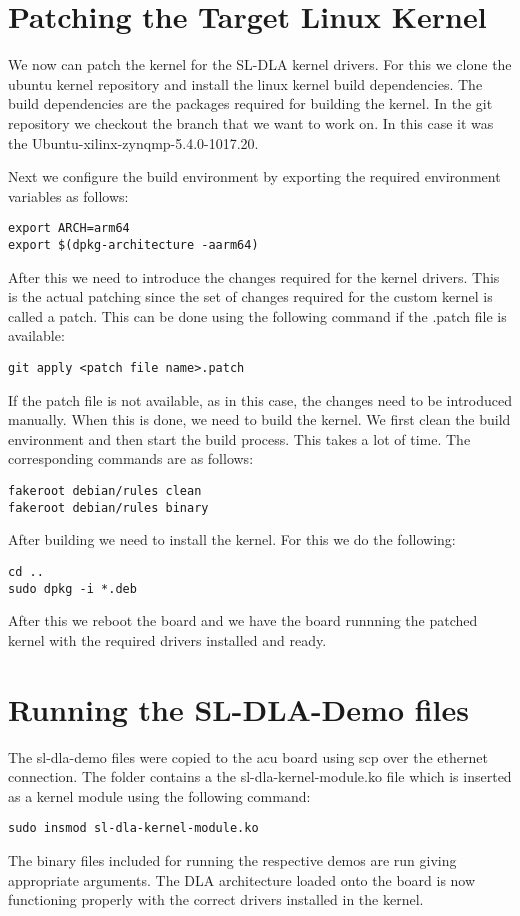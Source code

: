 \documentclass{article}
\begin{document}
\section{Patching the Target Linux Kernel}
We now can patch the kernel for the SL-DLA kernel drivers. For this we clone the ubuntu kernel repository and
install the linux kernel build dependencies. The build dependencies are the packages required for building the kernel.
In the git repository we checkout the branch that we want to work on. In this case it was the
Ubuntu-xilinx-zynqmp-5.4.0-1017.20.

\medbreak{}

Next we configure the build environment by exporting the required environment variables as follows:
\begin{lstlisting}
export ARCH=arm64
export $(dpkg-architecture -aarm64)
\end{lstlisting}

After this we need to introduce the changes required for the kernel drivers. This is the actual patching since
the set of changes required for the custom kernel is called a patch. This can be done using the following command
if the .patch file is available:
\begin{lstlisting}
git apply <patch file name>.patch
\end{lstlisting}

If the patch file is not available, as in this case, the changes need to be introduced manually. When this is done,
we need to build the kernel. We first clean the build environment and then start the build process. This takes
a lot of time. The corresponding commands are as follows:
\begin{lstlisting}
fakeroot debian/rules clean
fakeroot debian/rules binary
\end{lstlisting}

After building we need to install the kernel. For this we do the following:
\begin{lstlisting}
cd ..
sudo dpkg -i *.deb
\end{lstlisting}

After this we reboot the board and we have the board runnning the patched kernel with the required drivers
installed and ready.

\section{Running the SL-DLA-Demo files}
The sl-dla-demo files were copied to the acu board using scp over the ethernet connection. The folder contains a
the sl-dla-kernel-module.ko file which is inserted as a kernel module using the following command:
\begin{lstlisting}
sudo insmod sl-dla-kernel-module.ko
\end{lstlisting}

The binary files included for running the respective demos are run giving appropriate arguments. The DLA architecture
loaded onto the board is now functioning properly with the correct drivers installed in the kernel.
\end{document}
